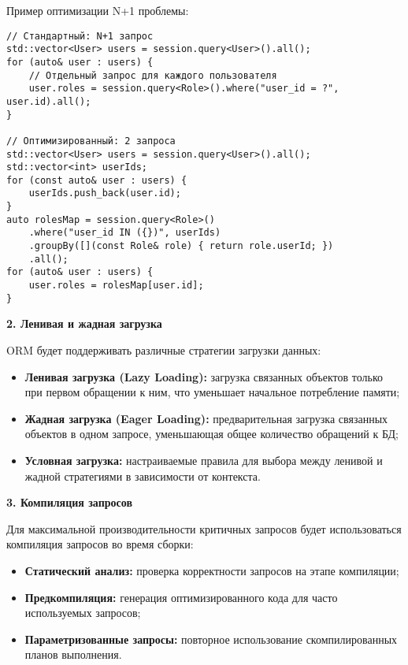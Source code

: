             Пример оптимизации N+1 проблемы:
            
            \begin{lstlisting}[style=cpp_style]
// Стандартный: N+1 запрос
std::vector<User> users = session.query<User>().all();
for (auto& user : users) {
    // Отдельный запрос для каждого пользователя
    user.roles = session.query<Role>().where("user_id = ?", user.id).all();
}

// Оптимизированный: 2 запроса
std::vector<User> users = session.query<User>().all();
std::vector<int> userIds;
for (const auto& user : users) {
    userIds.push_back(user.id);
}
auto rolesMap = session.query<Role>()
    .where("user_id IN ({})", userIds)
    .groupBy([](const Role& role) { return role.userId; })
    .all();
for (auto& user : users) {
    user.roles = rolesMap[user.id];
}
            \end{lstlisting}
        
        \textbf{2. Ленивая и жадная загрузка}
        
            ORM будет поддерживать различные стратегии загрузки данных:
            
            \begin{itemize}
                \item \textbf{Ленивая загрузка (Lazy Loading):} загрузка связанных объектов только при первом обращении к ним, что уменьшает начальное потребление памяти;
                
                \item \textbf{Жадная загрузка (Eager Loading):} предварительная загрузка связанных объектов в одном запросе, уменьшающая общее количество обращений к БД;
                
                \item \textbf{Условная загрузка:} настраиваемые правила для выбора между ленивой и жадной стратегиями в зависимости от контекста.
            \end{itemize}
        
        \textbf{3. Компиляция запросов}
        
            Для максимальной производительности критичных запросов будет использоваться компиляция запросов во время сборки:
            
            \begin{itemize}
                \item \textbf{Статический анализ:} проверка корректности запросов на этапе компиляции;
                
                \item \textbf{Предкомпиляция:} генерация оптимизированного кода для часто используемых запросов;
                
                \item \textbf{Параметризованные запросы:} повторное использование скомпилированных планов выполнения.
            \end{itemize}
        
